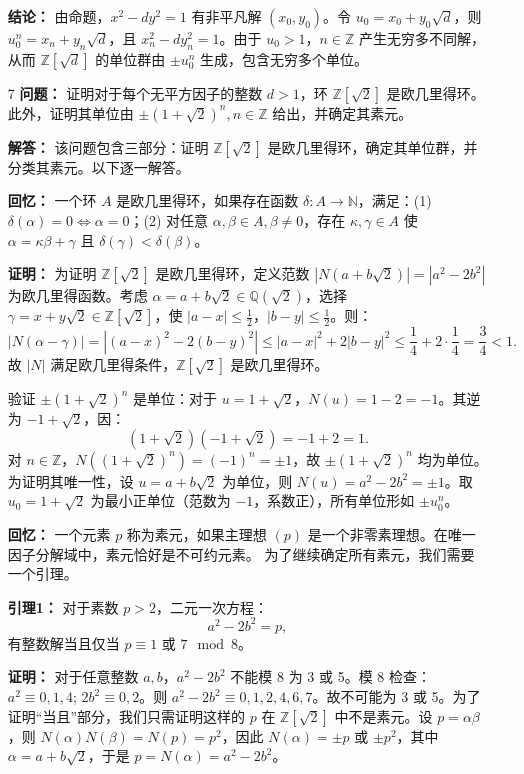\documentclass[UTF8]{ctexart}
\begin{document}
\begin{enumerate}
\textbf{结论：} 由命题，\(x^2 - d y^2 = 1\) 有非平凡解 \((x_0, y_0)\)。令 \(u_0 = x_0 + y_0 \sqrt{d}\)，则 \(u_0^n = x_n + y_n \sqrt{d}\)，且 \(x_n^2 - d y_n^2 = 1\)。由于 \(u_0 > 1\)，\(n \in \mathbb{Z}\) 产生无穷多不同解，从而 \(\mathbb{Z}[\sqrt{d}]\) 的单位群由 \(\pm u_0^n\) 生成，包含无穷多个单位。


\item[7] \textbf{问题：} 证明对于每个无平方因子的整数 \(d > 1\)，环 \(\mathbb{Z}[\sqrt{2}]\) 是欧几里得环。此外，证明其单位由 \(\pm (1 + \sqrt{2})^n, n \in \mathbb{Z}\) 给出，并确定其素元。

\textbf{解答：} 该问题包含三部分：证明 \(\mathbb{Z}[\sqrt{2}]\) 是欧几里得环，确定其单位群，并分类其素元。以下逐一解答。

\textbf{回忆：} 一个环 \(A\) 是欧几里得环，如果存在函数 \(\delta: A \to \mathbb{N}\)，满足：(1) \(\delta(\alpha) = 0 \iff \alpha = 0\)；(2) 对任意 \(\alpha, \beta \in A, \beta \neq 0\)，存在 \(\kappa, \gamma \in A\) 使 \(\alpha = \kappa \beta + \gamma\) 且 \(\delta(\gamma) < \delta(\beta)\)。

\textbf{证明：} 为证明 \(\mathbb{Z}[\sqrt{2}]\) 是欧几里得环，定义范数 \(|N(a + b \sqrt{2})| = |a^2 - 2 b^2|\) 为欧几里得函数。考虑 \(\alpha = a + b \sqrt{2} \in \mathbb{Q}(\sqrt{2})\)，选择 \(\gamma = x + y \sqrt{2} \in \mathbb{Z}[\sqrt{2}]\)，使 \(|a - x| \leq \frac{1}{2}\)，\(|b - y| \leq \frac{1}{2}\)。则：
\[
|N(\alpha - \gamma)| = |(a - x)^2 - 2 (b - y)^2| \leq |a - x|^2 + 2 |b - y|^2 \leq \frac{1}{4} + 2 \cdot \frac{1}{4} = \frac{3}{4} < 1.
\]
故 \(|N|\) 满足欧几里得条件，\(\mathbb{Z}[\sqrt{2}]\) 是欧几里得环。

验证 \(\pm (1 + \sqrt{2})^n\) 是单位：对于 \(u = 1 + \sqrt{2}\)，\(N(u) = 1 - 2 = -1\)。其逆为 \(-1 + \sqrt{2}\)，因：
\[
(1 + \sqrt{2})(-1 + \sqrt{2}) = -1 + 2 = 1.
\]
对 \(n \in \mathbb{Z}\)，\(N((1 + \sqrt{2})^n) = (-1)^n = \pm 1\)，故 \(\pm (1 + \sqrt{2})^n\) 均为单位。为证明其唯一性，设 \(u = a + b \sqrt{2}\) 为单位，则 \(N(u) = a^2 - 2 b^2 = \pm 1\)。取 \(u_0 = 1 + \sqrt{2}\) 为最小正单位（范数为 \(-1\)，系数正），所有单位形如 \(\pm u_0^n\)。

\textbf{回忆：} 一个元素 \(p\) 称为素元，如果主理想 \((p)\) 是一个非零素理想。在唯一因子分解域中，素元恰好是不可约元素。
为了继续确定所有素元，我们需要一个引理。

\textbf{引理1：} 对于素数 \(p > 2\)，二元一次方程：
\[
a^2 - 2 b^2 = p,
\]
有整数解当且仅当 \(p \equiv 1\) 或 \(7 \mod 8\)。  

\textbf{证明：} 对于任意整数 \(a, b\)，\(a^2 - 2 b^2\) 不能模 8 为 3 或 5。模 8 检查：\(a^2 \equiv 0, 1, 4\); \(2 b^2 \equiv 0, 2\)。则 \(a^2 - 2 b^2 \equiv 0, 1, 2, 4, 6, 7\)。故不可能为 3 或 5。为了证明“当且”部分，我们只需证明这样的 \(p\) 在 \(\mathbb{Z}[\sqrt{2}]\) 中不是素元。设 \(p = \alpha \beta\)，则 \(N(\alpha) N(\beta) = N(p) = p^2\)，因此 \(N(\alpha) = \pm p\) 或 \(\pm p^2\)，其中 \(\alpha = a + b \sqrt{2}\)，于是 \(p = N(\alpha) = a^2 - 2 b^2\)。


\end{enumerate}
\end{document}
